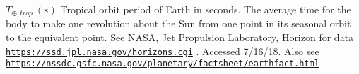 $ T_{\oplus,trop} \ (s)$ Tropical orbit period of Earth in seconds. The average time for the body to make one revolution about the Sun from one point in its seasonal orbit to the equivalent point. See N\+A\+SA, Jet Propulsion Laboratory, Horizon for data \href{https://ssd.jpl.nasa.gov/horizons.cgi}{\tt https\+://ssd.\+jpl.\+nasa.\+gov/horizons.\+cgi} . Accessed 7/16/18. Also see \href{https://nssdc.gsfc.nasa.gov/planetary/factsheet/earthfact.html}{\tt https\+://nssdc.\+gsfc.\+nasa.\+gov/planetary/factsheet/earthfact.\+html} 